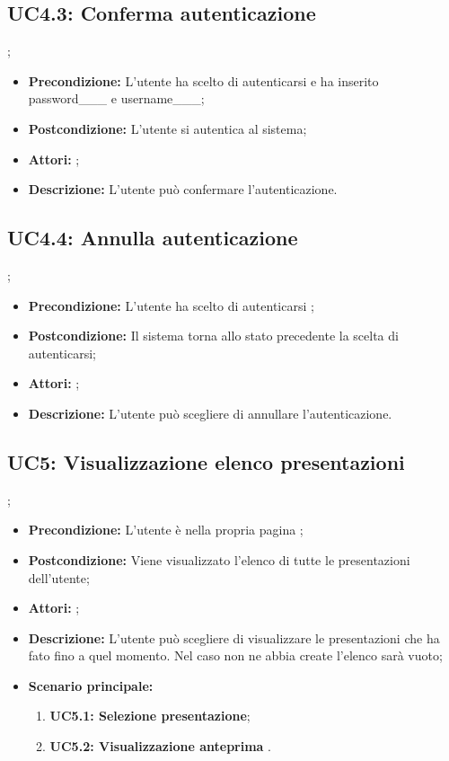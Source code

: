 \subsection{ UC4.3: Conferma autenticazione}
;
\begin{itemize}
	\item \textbf{Precondizione:} L'utente ha scelto di autenticarsi e ha inserito password___ e username___;
	\item \textbf{Postcondizione:} L'utente si autentica al sistema;
	\item \textbf{Attori:} ;
	\item \textbf{Descrizione:} L'utente può confermare l'autenticazione.
\end{itemize}
\subsection{ UC4.4: Annulla autenticazione}
;
\begin{itemize}
	\item \textbf{Precondizione:} L'utente ha scelto di autenticarsi ;
	\item \textbf{Postcondizione:} Il sistema torna allo stato precedente la scelta di autenticarsi;
	\item \textbf{Attori:} ;
	\item \textbf{Descrizione:} L'utente può scegliere di annullare l'autenticazione.
\end{itemize}
\subsection{ UC5: Visualizzazione elenco presentazioni}
;
\begin{itemize}
	\item \textbf{Precondizione:} L'utente è nella propria pagina ;
	\item \textbf{Postcondizione:} Viene visualizzato l'elenco di tutte le presentazioni dell'utente;
	\item \textbf{Attori:} ;
	\item \textbf{Descrizione:} L'utente può scegliere di visualizzare le presentazioni che ha fato fino a quel momento. Nel caso non ne abbia create l'elenco sarà vuoto;
	\item \textbf{Scenario principale:}
	\begin{enumerate}
		\item \textbf{ UC5.1: Selezione presentazione};
		\item \textbf{ UC5.2: Visualizzazione anteprima }.
	\end{enumerate}
\end{itemize}
